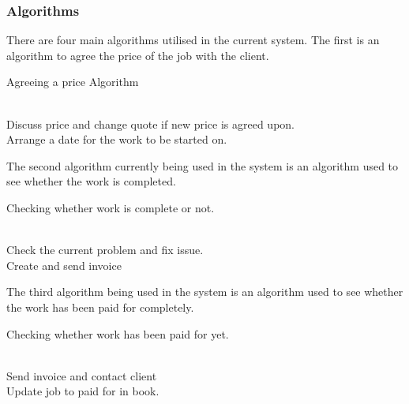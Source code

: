 \pagebreak
\subsubsection{Algorithms}

There are four main algorithms utilised in the current system. The first is an algorithm to agree the price of the job with the client.

\begin{algorithm}[H]
\label{fig:algorithm_example_1}
	\caption{Agreeing a price Algorithm}
\begin{algorithmic}[1]

	
					\\ Discuss price and change quote if new price is agreed upon.\;
		\Else 
			  \\ Arrange a date for the work to be started on.\;
		\EndIf
	\EndWhile

\end{algorithmic}
\end{algorithm}


The second algorithm currently being used in the system is an algorithm used to see whether the work is completed.


\begin{algorithm}[H]
	\label{fig:algorithm_work_complete}
		\caption{Checking whether work is complete or not.}
	\begin{algorithmic}[1]
			 \\ Check the current problem and fix issue.
			\Else
			\EndIf
		\EndWhile
		\\Create and send invoice
	\end{algorithmic}
\end{algorithm}

The third algorithm being used in the system is an algorithm used to see whether the work has been paid for completely.


\begin{algorithm}[H]
	\label{fig:algorithm_paid}
		\caption{Checking whether work has been paid for yet.}
	\begin{algorithmic}[1]
			 \\ Send invoice and contact client
			\Else
			\EndIf
		\EndWhile
		\\Update job to paid for in book.
	\end{algorithmic}
\end{algorithm}

